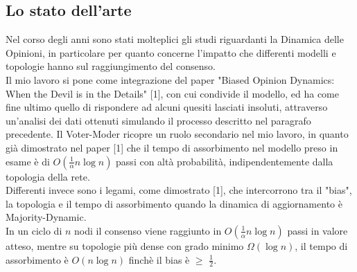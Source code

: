 \documentclass{article}
\begin{document}
\subsection{Lo stato dell'arte}
Nel corso degli anni sono stati molteplici gli studi riguardanti la Dinamica delle Opinioni, in particolare per quanto concerne l'impatto che differenti modelli e topologie hanno sul raggiungimento del consenso.\\
Il mio lavoro si pone come integrazione del paper "Biased Opinion Dynamics: When the Devil is in the Details" [1], con cui condivide il modello, ed ha come fine ultimo quello di rispondere ad alcuni quesiti lasciati insoluti, attraverso un'analisi dei dati ottenuti simulando il processo descritto nel paragrafo precedente.
Il Voter-Moder ricopre un ruolo secondario nel mio lavoro, in quanto già dimostrato nel paper [1] che il tempo di assorbimento nel modello preso in esame è di $O(\frac{1}{\alpha}n\log{}n)$ passi con altà probabilità, indipendentemente dalla topologia della rete.\\
Differenti invece sono i legami, come dimostrato [1], che intercorrono tra il "bias", la topologia e il tempo di assorbimento quando la dinamica di aggiornamento è Majority-Dynamic.\\
In un ciclo di $n$ nodi il consenso viene raggiunto in $O(\frac{1}{\alpha}n\log{}n)$ passi in valore atteso, mentre su topologie più dense con grado minimo $\Omega(\log{}n)$, il tempo di assorbimento è $O(n\log{}n)$ finchè il bias è $\geq$ $\frac{1}{2}$.\\
\end{document}
